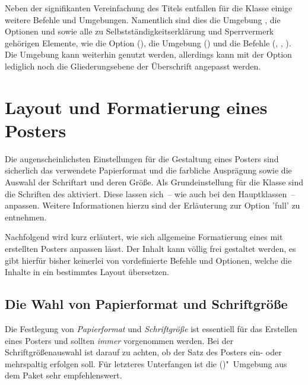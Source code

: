 \begin{Bundle*}{}
Neben der signifikanten Vereinfachung des Titels entfallen für die Klasse 
 einige weitere Befehle und Umgebungen. Namentlich sind 
dies die Umgebung , die Optionen  
und  sowie alle zu Selbstständigkeitserklärung und 
Sperrvermerk gehörigen Elemente, wie die Option (), die 
Umgebung () und die Befehle (, 
, ). Die Umgebung  
kann weiterhin genutzt werden, allerdings kann mit der Option  
lediglich noch die Gliederungsebene der Überschrift angepasst werden.

\section{Layout und Formatierung eines Posters}
%
Die augenscheinlichsten Einstellungen für die Gestaltung eines Posters sind 
sicherlich das verwendete Papierformat und die farbliche Ausprägung sowie die 
Auswahl der Schriftart und deren Größe. Als Grundeinstellung für die Klasse
 sind die Schriften des \TUDCDs aktiviert. Diese lassen 
sich~-- wie auch bei den Hauptklassen~-- anpassen. Weitere Informationen hierzu 
sind der Erläuterung zur Option 'full' zu entnehmen.

Nachfolgend wird kurz erläutert, wie sich allgemeine Formatierung eines mit 
 erstellten Posters anpassen lässt. Der Inhalt kann völlig 
frei gestaltet werden, es gibt hierfür bisher keinerlei von \TUDScript 
vordefinierte Befehle und Optionen, welche die Inhalte in ein bestimmtes Layout 
übersetzen.
 


\subsection{Die Wahl von Papierformat und Schriftgröße}
%
%
%

Die Festlegung von \emph{Papierformat} und \emph{Schriftgröße} ist essentiell 
für das Erstellen eines Posters und sollten \emph{immer} vorgenommen werden. 
Bei der Schriftgrößenauswahl ist darauf zu achten, ob der Satz des Posters 
ein- oder mehrspaltig erfolgen soll. Für letzteres Unterfangen ist die 
()"~Umgebung aus dem Paket 
 sehr empfehlenswert. 


\end{Bundle*}
